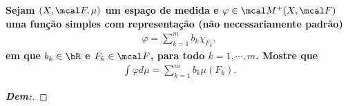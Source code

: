\biglinend 
\newpage
{}
\myexe{\thetres}
\bigline 
\textbf{Sejam $(X, \mcal F, \mu)$ um espaço de medida e $\varphi \in \mcal M^+(X, \mcal F)$
uma função simples com representação (não necessariamente padrão)
\begin{align*}
  \varphi = \sum_{k =1}^mb_k \chi_{F_k},
\end{align*}
em que $b_k \in \bR$ e $F_k \in \mcal F$, para todo $k=1, \cdots, m$. Mostre que 
\begin{align*}
  \int \varphi d\mu = \sum_{k=1}^m b_k \mu(F_k).
\end{align*}}
\begin{proof}[\textbf{Dem:}]
  
\end{proof}
